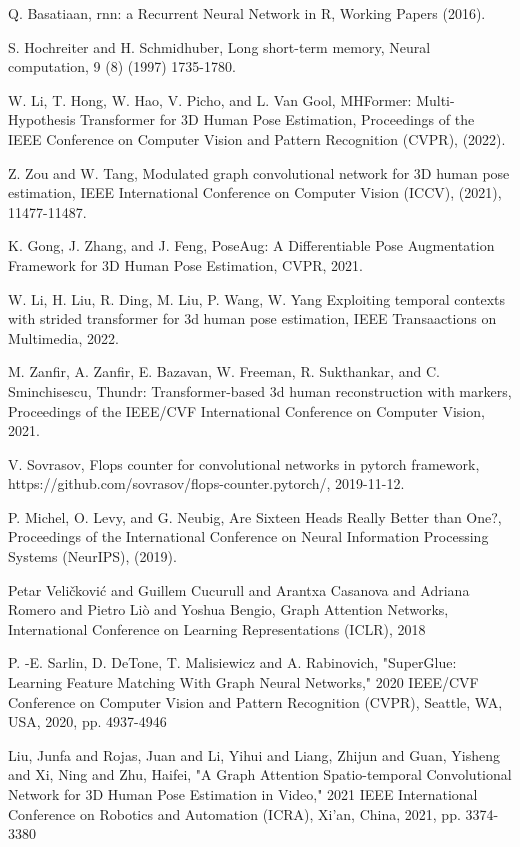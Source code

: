 \documentclass{article}
\begin{document}
\begin{thebibliography}{9}
 Q. Basatiaan, rnn: a Recurrent Neural Network in R, Working Papers (2016).

 S. Hochreiter and H. Schmidhuber, Long short-term memory, Neural computation, 9 (8) (1997) 1735-1780.

 W. Li, T. Hong, W. Hao, V. Picho, and L. Van Gool, MHFormer: Multi-Hypothesis Transformer for 3D Human Pose Estimation, Proceedings of the IEEE Conference on Computer Vision and Pattern Recognition (CVPR), (2022).

 Z. Zou and W. Tang, Modulated graph convolutional network for 3D human pose estimation, IEEE International Conference on Computer Vision (ICCV), (2021), 11477-11487.

 K. Gong, J. Zhang, and J. Feng, PoseAug: A Differentiable Pose Augmentation Framework for 3D Human Pose Estimation, CVPR, 2021.


 W. Li, H. Liu, R. Ding, M. Liu, P. Wang, W. Yang Exploiting temporal contexts with strided transformer for 3d human pose estimation, IEEE Transaactions on Multimedia, 2022. 

 M. Zanfir, A. Zanfir, E. Bazavan, W. Freeman, R. Sukthankar, and C. Sminchisescu, Thundr: Transformer-based 3d human reconstruction with markers, Proceedings of the IEEE/CVF International Conference on Computer Vision, 2021. 

 V. Sovrasov, Flops counter for convolutional networks in pytorch framework, https://github.com/sovrasov/flops-counter.pytorch/, 2019-11-12.


 P. Michel, O. Levy, and G. Neubig, Are Sixteen Heads Really Better than One?, Proceedings of the International Conference on Neural Information Processing Systems (NeurIPS), (2019).

 Petar Veličković and Guillem Cucurull and Arantxa Casanova and Adriana Romero and Pietro Liò and Yoshua Bengio, Graph Attention Networks, International Conference on Learning Representations (ICLR), 2018 

 P. -E. Sarlin, D. DeTone, T. Malisiewicz and A. Rabinovich, "SuperGlue: Learning Feature Matching With Graph Neural Networks," 2020 IEEE/CVF Conference on Computer Vision and Pattern Recognition (CVPR), Seattle, WA, USA, 2020, pp. 4937-4946

 Liu, Junfa and Rojas, Juan and Li, Yihui and Liang, Zhijun and Guan, Yisheng and Xi, Ning and Zhu, Haifei, "A Graph Attention Spatio-temporal Convolutional Network for 3D Human Pose Estimation in Video," 2021 IEEE International Conference on Robotics and Automation (ICRA), Xi'an, China, 2021, pp. 3374-3380


\end{thebibliography}
\end{document}
